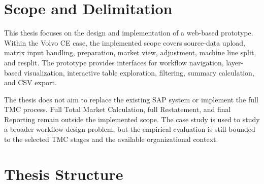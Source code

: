 


\section{Scope and Delimitation}

This thesis focuses on the design and implementation of a web-based prototype. Within the Volvo CE case, the implemented scope covers source-data upload, matrix input handling, preparation, market view, adjustment, machine line split, and resplit. The prototype provides interfaces for workflow navigation, layer-based visualization, interactive table exploration, filtering, summary calculation, and CSV export.

The thesis does not aim to replace the existing SAP system or implement the full TMC process. Full Total Market Calculation, full Restatement, and final Reporting remain outside the implemented scope. The case study is used to study a broader workflow-design problem, but the empirical evaluation is still bounded to the selected TMC stages and the available organizational context.








\section{Thesis Structure}

